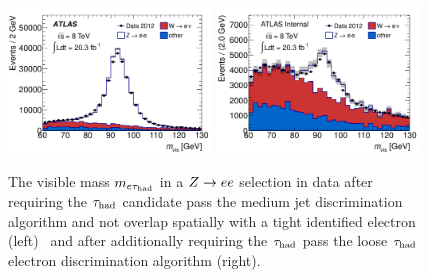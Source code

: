 \begin{figure}[tp]
  \centering
  \includegraphics[width=0.48\textwidth]{figures/PERF-2013-06/fig_14a}
  \includegraphics[width=0.48\textwidth]{figures/PERF-2013-06/eveto_mvis_mediumID_loosePPOLR_looseeveto}
  \caption{The visible mass $m_{e\tau_\text{had}}$ in a $Z \rightarrow ee$ selection in data after requiring the $\tau_\text{had}$ candidate pass the medium jet discrimination algorithm and not overlap spatially with a tight identified electron (left)~\cite{PERF-2013-06} and after additionally requiring the $\tau_\text{had}$ pass the loose $\tau_\text{had}$ electron discrimination algorithm (right).}
  \label{fig:taus-electronfakes2}
\end{figure}

